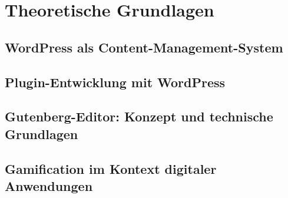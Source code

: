 \chapter{Theoretische Grundlagen}
\section{WordPress als Content-Management-System}
\section{Plugin-Entwicklung mit WordPress}
\section{Gutenberg-Editor: Konzept und technische Grundlagen}
\section{Gamification im Kontext digitaler Anwendungen}
